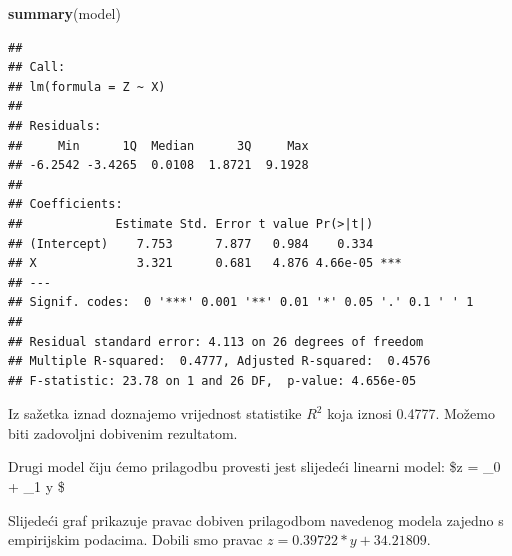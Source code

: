 \documentclass[]{article}
\newenvironment{Shaded}{\begin{snugshade}}{\end{snugshade}}
\newcommand{\KeywordTok}[1]{\textcolor[rgb]{0.13,0.29,0.53}{\textbf{{#1}}}}
\newcommand{\DataTypeTok}[1]{\textcolor[rgb]{0.13,0.29,0.53}{{#1}}}
\newcommand{\StringTok}[1]{\textcolor[rgb]{0.31,0.60,0.02}{{#1}}}
\newcommand{\NormalTok}[1]{{#1}}
\begin{document}
\begin{Shaded}
\begin{Highlighting}[]
\KeywordTok{summary}\NormalTok{(model)}
\end{Highlighting}
\end{Shaded}

\begin{verbatim}
## 
## Call:
## lm(formula = Z ~ X)
## 
## Residuals:
##     Min      1Q  Median      3Q     Max 
## -6.2542 -3.4265  0.0108  1.8721  9.1928 
## 
## Coefficients:
##             Estimate Std. Error t value Pr(>|t|)    
## (Intercept)    7.753      7.877   0.984    0.334    
## X              3.321      0.681   4.876 4.66e-05 ***
## ---
## Signif. codes:  0 '***' 0.001 '**' 0.01 '*' 0.05 '.' 0.1 ' ' 1
## 
## Residual standard error: 4.113 on 26 degrees of freedom
## Multiple R-squared:  0.4777, Adjusted R-squared:  0.4576 
## F-statistic: 23.78 on 1 and 26 DF,  p-value: 4.656e-05
\end{verbatim}

Iz sažetka iznad doznajemo vrijednost statistike \(R^2\) koja iznosi
0.4777. Možemo biti zadovoljni dobivenim rezultatom.

Drugi model čiju ćemo prilagodbu provesti jest slijedeći linearni model:
\$z = \beta\_0 + \beta\_1 y \$

\begin{Shaded}
\end{Shaded}

Slijedeći graf prikazuje pravac dobiven prilagodbom navedenog modela
zajedno s empirijskim podacima. Dobili smo pravac
\(z = 0.39722*y + 34.21809\).

\begin{Shaded}
\end{Shaded}
\end{document}
